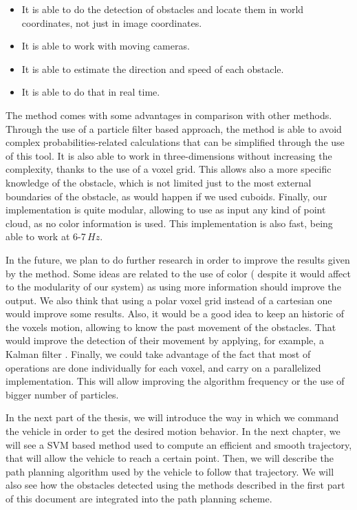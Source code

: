 \begin{itemize}
 \item It is able to do the detection of obstacles and locate them in world coordinates, not just in image coordinates.
 \item It is able to work with moving cameras.
 \item It is able to estimate the direction and speed of each obstacle.
 \item It is able to do that in real time.
\end{itemize}



The method comes with some advantages in comparison with other methods. Through the use of a particle filter based approach, the method is able to avoid complex probabilities-related calculations that can be simplified through the use of this tool. It is also able to work in three-dimensions without increasing the complexity, thanks to the use of a voxel grid. This allows also a more specific knowledge of the obstacle, which is not limited just to the most external boundaries of the obstacle, as would happen if we used cuboids. Finally, our implementation is quite modular, allowing to use as input any kind of point cloud, as no color information is used. This implementation is also fast, being able to work at 6-7\,$Hz$.

In the future, we plan to do further research in order to improve the results given by the method. Some ideas are related to the use of color ( despite it would affect to the modularity of our system) as using more information should improve the output. We also think that using a polar voxel grid instead of a cartesian one would improve some results. Also, it would be a good idea to keep an historic of the voxels motion, allowing to know the past movement of the obstacles. That would improve the detection of their movement by applying, for example, a Kalman filter \citep{kalman1960new}. Finally, we could take advantage of the fact that most of operations are done individually for each voxel, and carry on a parallelized implementation. This will allow improving the algorithm frequency or the use of bigger number of particles.

In the next part of the thesis, we will introduce the way in which we command the vehicle in order to get the desired motion behavior. In the next chapter, we will see a \ac{SVM} based method used to compute an efficient and smooth trajectory, that will allow the vehicle to reach a certain point. Then, we will describe the path planning algorithm used by the vehicle to follow that trajectory. We will also see how the obstacles detected using the methods described in the first part of this document are integrated into the path planning scheme.
 
 
 
 